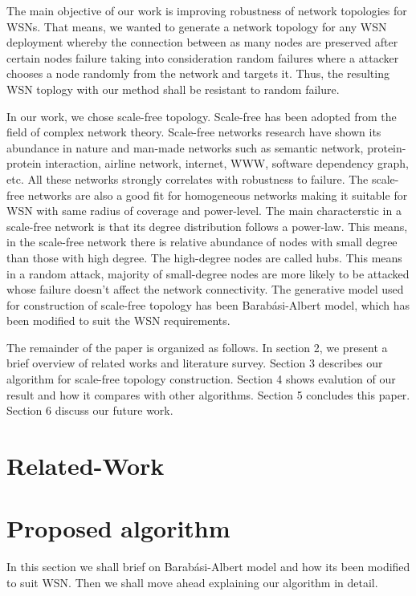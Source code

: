 \documentclass{article}
\begin{document}
The main objective of our work is improving robustness of network topologies for WSNs. That means, we wanted to generate a network topology for any WSN deployment whereby the connection between as many nodes are preserved after certain nodes failure taking into consideration random failures where a attacker chooses a node randomly from the network and targets it. Thus, the resulting WSN toplogy with our method shall be resistant to random failure.

In our work, we chose scale-free topology. Scale-free has been adopted from the field of complex network theory. Scale-free networks research have shown its abundance in nature and man-made networks such as semantic network, protein-protein interaction, airline network, internet, WWW, software dependency graph, etc. All these networks strongly correlates with robustness to failure. The scale-free networks are also a good fit for homogeneous networks making it suitable for WSN with same radius of coverage and power-level. The main characterstic in a scale-free network is that its degree distribution follows a power-law. This means, in the scale-free network there is relative abundance of nodes with small degree than those with high degree. The high-degree nodes are called hubs. This means in a random attack, majority of small-degree nodes are more likely to be attacked whose failure doesn't affect the network connectivity. The generative model used for construction of scale-free topology has been Barab{\'a}si-Albert model, which has been modified to suit the WSN requirements. 

The remainder of the paper is organized as follows. In section 2, we present a brief overview of related works and literature survey. Section 3 describes our algorithm for scale-free topology construction. Section 4 shows evalution of our result and how it compares with other algorithms. Section 5 concludes this paper. Section 6 discuss our future work.

\section{Related-Work}

\section{Proposed algorithm}
In this section we shall brief on Barab{\'a}si-Albert model and how its been modified to suit WSN. Then we shall move ahead explaining our algorithm in detail.
\end{document}
